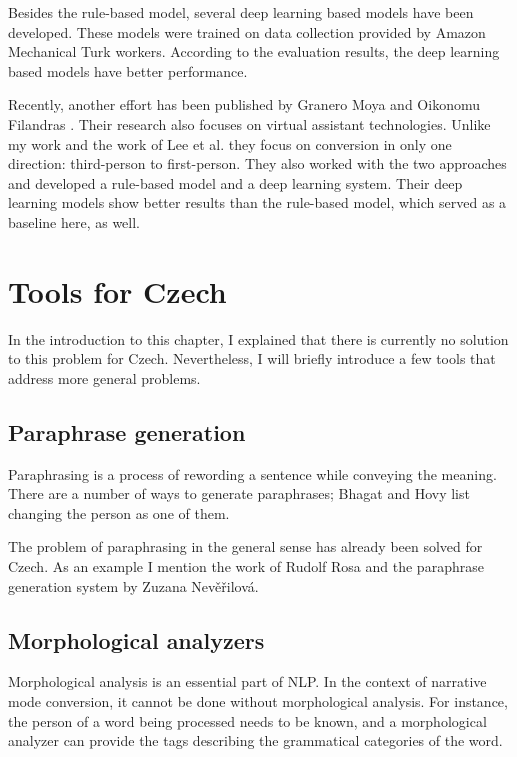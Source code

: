 Besides the rule-based model, several deep learning based models have been developed. These models were trained on data collection provided by Amazon Mechanical Turk workers. According to the evaluation results, the deep learning based models have better performance.

Recently, another effort has been published by Granero Moya and Oikonomu Filandras \cite{granero-moya-oikonomou-filandras-2021-taking}. Their research also focuses on virtual assistant technologies. Unlike my work and the work of Lee et al. they focus on conversion in only one direction: third-person to first-person. They also worked with the two approaches and developed a rule-based model and a deep learning system. Their deep learning models show better results than the rule-based model, which served as a baseline here, as well.

\section{Tools for Czech}

In the introduction to this chapter, I explained that there is currently no solution to this problem for Czech. Nevertheless, I will briefly introduce a few tools that address more general problems.

\subsection{Paraphrase generation}

Paraphrasing is a process of rewording a sentence while conveying the meaning. There are a number of ways to generate paraphrases; Bhagat and Hovy \cite{bhagat-hovy-2013-squibs} list changing the person as one of them.

The problem of paraphrasing in the general sense has already been solved for Czech. As an example I mention the work of Rudolf Rosa and the paraphrase generation system by Zuzana Nevěřilová. \cite{Neverilova2014thesis}

\subsection{Morphological analyzers}

Morphological analysis is an essential part of NLP. In the context of narrative mode conversion, it cannot be done without morphological analysis. For instance, the person of a word being processed needs to be known, and a morphological analyzer can provide the tags describing the grammatical categories of the word.

